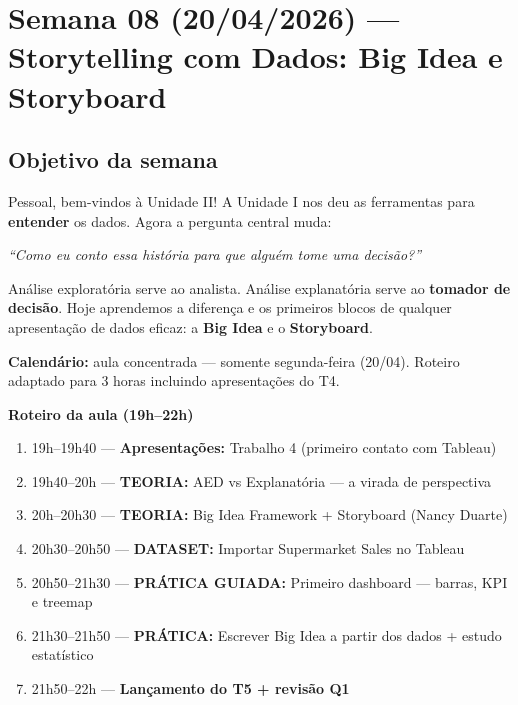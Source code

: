 
\chapter{Semana 08 (20/04/2026) — Storytelling com Dados: Big Idea e Storyboard}

\section{Objetivo da semana}

Pessoal, bem-vindos à Unidade II! A Unidade I nos deu as ferramentas para
\textbf{entender} os dados. Agora a pergunta central muda:

\begin{center}
\textit{``Como eu conto essa história para que alguém tome uma decisão?''}
\end{center}

Análise exploratória serve ao analista. Análise explanatória serve ao
\textbf{tomador de decisão}. Hoje aprendemos a diferença e os primeiros
blocos de qualquer apresentação de dados eficaz: a \textbf{Big Idea} e
o \textbf{Storyboard}.

\begin{NoteBox}
\textbf{Calendário:} aula concentrada — somente segunda-feira (20/04).
Roteiro adaptado para 3 horas incluindo apresentações do T4.
\end{NoteBox}

\begin{BoardBox}
\textbf{Roteiro da aula (19h–22h)}
\begin{enumerate}
  \item 19h–19h40 — \textbf{Apresentações:} Trabalho 4 (primeiro contato com Tableau)
  \item 19h40–20h — \textbf{TEORIA:} AED vs Explanatória — a virada de perspectiva
  \item 20h–20h30 — \textbf{TEORIA:} Big Idea Framework + Storyboard (Nancy Duarte)
  \item 20h30–20h50 — \textbf{DATASET:} Importar Supermarket Sales no Tableau
  \item 20h50–21h30 — \textbf{PRÁTICA GUIADA:} Primeiro dashboard — barras, KPI e treemap
  \item 21h30–21h50 — \textbf{PRÁTICA:} Escrever Big Idea a partir dos dados + estudo estatístico
  \item 21h50–22h — \textbf{Lançamento do T5 + revisão Q1}
\end{enumerate}
\end{BoardBox}

